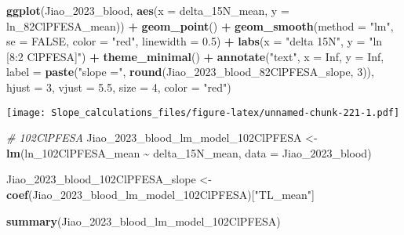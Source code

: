 \documentclass[
]{article}
\newenvironment{Shaded}{\begin{snugshade}}{\end{snugshade}}
\newcommand{\AttributeTok}[1]{\textcolor[rgb]{0.13,0.29,0.53}{#1}}
\newcommand{\CommentTok}[1]{\textcolor[rgb]{0.56,0.35,0.01}{\textit{#1}}}
\newcommand{\ConstantTok}[1]{\textcolor[rgb]{0.56,0.35,0.01}{#1}}
\newcommand{\DecValTok}[1]{\textcolor[rgb]{0.00,0.00,0.81}{#1}}
\newcommand{\FloatTok}[1]{\textcolor[rgb]{0.00,0.00,0.81}{#1}}
\newcommand{\FunctionTok}[1]{\textcolor[rgb]{0.13,0.29,0.53}{\textbf{#1}}}
\newcommand{\NormalTok}[1]{#1}
\newcommand{\OtherTok}[1]{\textcolor[rgb]{0.56,0.35,0.01}{#1}}
\newcommand{\SpecialCharTok}[1]{\textcolor[rgb]{0.81,0.36,0.00}{\textbf{#1}}}
\newcommand{\StringTok}[1]{\textcolor[rgb]{0.31,0.60,0.02}{#1}}
\begin{document}
\begin{Shaded}
\begin{Highlighting}[]
\FunctionTok{ggplot}\NormalTok{(Jiao\_2023\_blood, }\FunctionTok{aes}\NormalTok{(}\AttributeTok{x =}\NormalTok{ delta\_15N\_mean, }\AttributeTok{y =}\NormalTok{ ln\_82ClPFESA\_mean)) }\SpecialCharTok{+}
  \FunctionTok{geom\_point}\NormalTok{() }\SpecialCharTok{+}
  \FunctionTok{geom\_smooth}\NormalTok{(}\AttributeTok{method =} \StringTok{"lm"}\NormalTok{, }\AttributeTok{se =} \ConstantTok{FALSE}\NormalTok{, }\AttributeTok{color =} \StringTok{"red"}\NormalTok{, }\AttributeTok{linewidth =} \FloatTok{0.5}\NormalTok{) }\SpecialCharTok{+}
  \FunctionTok{labs}\NormalTok{(}\AttributeTok{x =} \StringTok{"delta 15N"}\NormalTok{,}
       \AttributeTok{y =} \StringTok{"ln [8:2 ClPFESA]"}\NormalTok{) }\SpecialCharTok{+}
  \FunctionTok{theme\_minimal}\NormalTok{() }\SpecialCharTok{+}
  \FunctionTok{annotate}\NormalTok{(}\StringTok{"text"}\NormalTok{, }\AttributeTok{x =} \ConstantTok{Inf}\NormalTok{, }\AttributeTok{y =} \ConstantTok{Inf}\NormalTok{, }\AttributeTok{label =} \FunctionTok{paste}\NormalTok{(}\StringTok{"slope ="}\NormalTok{, }\FunctionTok{round}\NormalTok{(Jiao\_2023\_blood\_82ClPFESA\_slope, }\DecValTok{3}\NormalTok{)), }
           \AttributeTok{hjust =} \DecValTok{3}\NormalTok{, }\AttributeTok{vjust =} \FloatTok{5.5}\NormalTok{, }\AttributeTok{size =} \DecValTok{4}\NormalTok{, }\AttributeTok{color =} \StringTok{"red"}\NormalTok{)}
\end{Highlighting}
\end{Shaded}

\texttt{[image: Slope\_calculations\_files/figure-latex/unnamed-chunk-221-1.pdf]}

\begin{Shaded}
\begin{Highlighting}[]
\CommentTok{\# 102ClPFESA}
\NormalTok{Jiao\_2023\_blood\_lm\_model\_102ClPFESA }\OtherTok{\textless{}{-}} \FunctionTok{lm}\NormalTok{(ln\_102ClPFESA\_mean }\SpecialCharTok{\textasciitilde{}}\NormalTok{ delta\_15N\_mean,}
                                    \AttributeTok{data =}\NormalTok{ Jiao\_2023\_blood)}

\NormalTok{Jiao\_2023\_blood\_102ClPFESA\_slope }\OtherTok{\textless{}{-}} \FunctionTok{coef}\NormalTok{(Jiao\_2023\_blood\_lm\_model\_102ClPFESA)[}\StringTok{"TL\_mean"}\NormalTok{]}

\FunctionTok{summary}\NormalTok{(Jiao\_2023\_blood\_lm\_model\_102ClPFESA)}
\end{Highlighting}
\end{Shaded}
\end{document}
